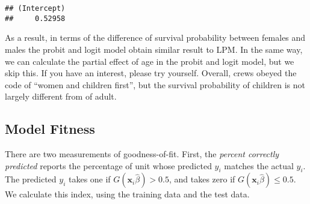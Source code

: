 \documentclass[
  12pt,
]{article}
\begin{document}
\begin{verbatim}
## (Intercept) 
##     0.52958
\end{verbatim}

As a result, in terms of the difference of survival probability between
females and males the probit and logit model obtain similar result to
LPM. In the same way, we can calculate the partial effect of age in the
probit and logit model, but we skip this. If you have an interest,
please try yourself. Overall, crews obeyed the code of ``women and
children first'', but the survival probability of children is not
largely different from of adult.

\hypertarget{model-fitness}{%
\subsection{Model Fitness}\label{model-fitness}}

There are two measurements of goodness-of-fit. First, the \emph{percent
correctly predicted} reports the percentage of unit whose predicted
\(y_i\) matches the actual \(y_i\). The predicted \(y_i\) takes one if
\(G(\mathbf{x}_i \hat{\beta}) > 0.5\), and takes zero if
\(G(\mathbf{x}_i \hat{\beta}) \le 0.5\). We calculate this index, using
the training data and the test data.
\end{document}
